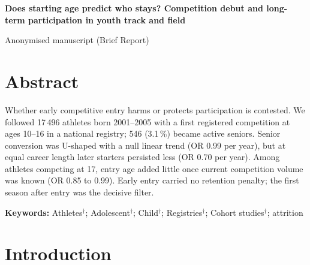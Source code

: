 \documentclass[12pt,a4paper]{article}
\begin{document}
\begin{center}
{\LARGE\bfseries Does starting age predict who stays? Competition debut and long-term participation in youth track and field\par}
\vspace{0.5em}
{\normalsize Anonymised manuscript (Brief Report)\par}
\end{center}

\section*{Abstract}

\noindent Whether early competitive entry harms or protects participation is contested. We followed 17\,496 athletes born 2001--2005 with a first registered competition at ages 10--16 in a national registry; 546 (3.1\,\%) became active seniors. Senior conversion was U-shaped with a null linear trend (OR 0.99 per year), but at equal career length later starters persisted less (OR 0.70 per year). Among athletes competing at 17, entry age added little once current competition volume was known (OR 0.85 to 0.99). Early entry carried no retention penalty; the first season after entry was the decisive filter.

\vspace{0.5em}
\noindent\textbf{Keywords:} Athletes$^\dagger$; Adolescent$^\dagger$; Child$^\dagger$; Registries$^\dagger$; Cohort studies$^\dagger$; attrition


\newpage

\section{Introduction}
\end{document}
